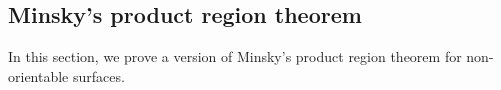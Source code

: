 \documentclass[12pt, reqno]{amsart}
\begin{document}

\subsection{Minsky's product region theorem}
\label{sec:minskys-prod-regi}

In this section, we prove a version of Minsky's product region theorem \cite[Theorem 6.1]{1077244446} for non-orientable surfaces.


\end{document}
